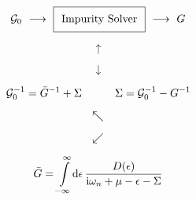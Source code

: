 \documentclass[10pt]{article}
\begin{document}
\thispagestyle{empty}

\begin{equation*}
  \mathcal{G}_0\ \longrightarrow
  \ \text{\setlength\fboxsep{7pt}\fbox{Impurity Solver}}\ 
  \longrightarrow\  G
  \vspace*{-3mm}
\end{equation*}
\begin{center}
  \begin{minipage}[c]{0.42\linewidth}
    \begin{equation*}
      \uparrow
    \end{equation*}
  \end{minipage}
  \begin{minipage}[c]{0.42\linewidth}
    \begin{equation*}
      \downarrow
    \end{equation*}
  \end{minipage}
\end{center}
\vspace*{0mm}
\begin{equation*}
  \mathcal{G}_0^{-1} = \bar G^{-1} +
  \Sigma
  \quad\quad\quad
  \Sigma = \mathcal{G}_0^{-1} - G^{-1}
  \vspace*{-3mm}
\end{equation*}
\begin{center}
  \begin{minipage}[c]{0.3\linewidth}
    \begin{equation*}
      \vspace*{-3mm}
      \nwarrow
    \end{equation*}
  \end{minipage}
  \begin{minipage}[c]{0.3\linewidth}
    \begin{equation*}
      \vspace*{-3mm}
      \swarrow
    \end{equation*}
  \end{minipage}
\end{center}
\begin{equation*}
  \bar G = \int\limits_{-\infty}^{\infty}\!{\rm d}\epsilon\, \frac{D(\epsilon)}
    {\mathrm{i}\omega_n + \mu - \epsilon - \Sigma}
\end{equation*}
\end{document}
